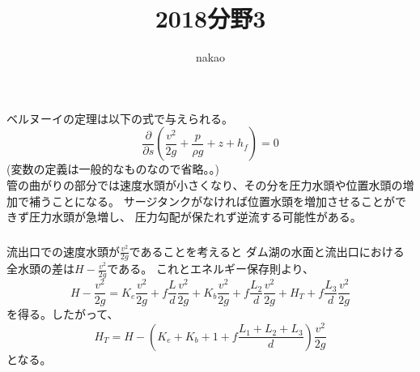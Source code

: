 \documentclass[a4paper]{jsarticle}
\begin{document}
\title{2018分野3}
\author{nakao}
\maketitle

\section{}
\subsection{}
\subsection{}
\subsection{}
\subsection{}
\subsubsection{}
ベルヌーイの定理は以下の式で与えられる。
\begin{equation}
  \frac{\partial}{\partial s}
  \left(\frac{v^2}{2 g} + \frac{p}{\rho g} + z + h_f\right) = 0
\end{equation}
(変数の定義は一般的なものなので省略。。) \\
管の曲がりの部分では速度水頭が小さくなり、その分を圧力水頭や位置水頭の増加で補うことになる。
サージタンクがなければ位置水頭を増加させることができず圧力水頭が急増し、
圧力勾配が保たれず逆流する可能性がある。

\subsubsection{}
流出口での速度水頭が$\frac{v^2}{2g}$であることを考えると
ダム湖の水面と流出口における全水頭の差は$H - \frac{v^2}{2g}$である。
これとエネルギー保存則より、
\begin{equation}
  H - \frac{v^2}{2g} = K_e \frac{v^2}{2g} + f \frac{L}{d} \frac{v^2}{2g}
  + K_b \frac{v^2}{2g} + f \frac{L_2}{d} \frac{v^2}{2g} + H_T +
  f \frac{L_3}{d} \frac{v^2}{2g}
\end{equation}
を得る。したがって、
\begin{equation}
  H_T = H - \left(K_e + K_b + 1 + f\frac{L_1 + L_2 + L_3}{d}\right) \frac{v^2}{2g}
\end{equation}
となる。
\end{document}
